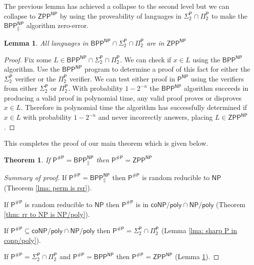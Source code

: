 \documentclass[10pt,a4paper]{article}
\newtheorem*{theorem*}{Theorem}
\newtheorem{lemma}[theorem]{Lemma}
\begin{document}
The previous lemma has achieved a collapse to the second level but we can collapse to $\mathsf{ZPP^{NP}}$ by using the proveability of languages in $\mathsf{\Sigma_2^P\cap \Pi_2^P}$ to make the $\mathsf{BPP^{NP}_{\parallel}}$ algorithm zero-error.

\begin{lemma}\label{lma: sharp P in ZPP}
    All languages in $\mathsf{BPP^{NP}\cap\Sigma_2^P\cap \Pi_2^P}$ are in $\mathsf{ZPP^{NP}}$
\end{lemma}
\begin{proof}
    Fix some $L\in \mathsf{BPP^{NP}\cap\Sigma_2^P\cap \Pi_2^P}$. We can check if $x\in L$ using the $\mathsf{BPP^{NP}}$ algorithm. Use the $\mathsf{BPP^{NP}}$ program to determine a proof of this fact for either the $\mathsf{\Sigma_2^P}$ verifier or the $\mathsf{\Pi_2^P}$ verifier. We can test either proof in $\mathsf{P^{NP}}$ using the verifiers from either $\mathsf{\Sigma_2^{P}}$ or $\mathsf{\Pi_2^{P}}$. With probability $1-2^{-n}$ the $\mathsf{BPP^{NP}}$ algorithm succeeds in producing a valid proof in polynomial time, any valid proof proves or disproves $x\in L$. Therefore in polynomial time the algorithm has successfully determined if $x\in L$ with probability $1-2^{-n}$ and never incorrectly answers, placing $L\in \mathsf{ZPP^{NP}}$.
\end{proof}

This completes the proof of our main theorem which is given below.

\begin{theorem*}
    If $\mathsf{P^{\# P} = BPP^{NP}_{\parallel}}$ then $\mathsf{P^{\# P} = ZPP^{NP}}$
\end{theorem*}
\begin{proof}[Summary of proof]
    If $\mathsf{P^{\# P} = BPP^{NP}_{\parallel}}$ then $\mathsf{P^{\#P}}$ is random reducible to $\mathsf{NP}$ (Theorem \ref{lma: perm is rsr}).

    If $\mathsf{P^{\# P}}$ is random reducible to $\mathsf{NP}$ then $\mathsf{P^{\#P}}$ is in $\mathsf{coNP/poly \cap NP/poly}$ (Theorem \ref{thm: rr to NP is NP/poly}).

    If $\mathsf{P^{\#P}\subseteq coNP/poly \cap NP/poly}$ then $\mathsf{P^{\#P}} = \mathsf{\Sigma_2^P\cap \Pi_2^P}$ (Lemma \ref{lma: sharp P in conp/poly}).

    If $\mathsf{P^{\#P}} = \mathsf{\Sigma_2^P\cap \Pi_2^P}$ and $\mathsf{P^{\#P}= BPP^{NP}}$ then $\mathsf{P^{\#P}= ZPP^{NP}}$ (Lemma \ref{lma: sharp P in ZPP}).
\end{proof}
\end{document}
